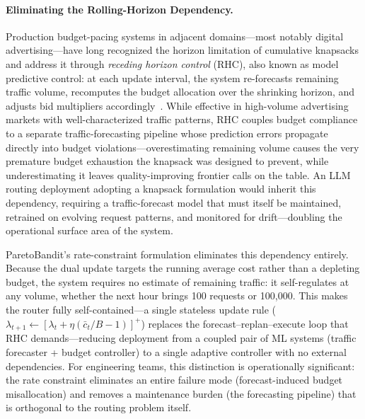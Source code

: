 \paragraph{Eliminating the Rolling-Horizon Dependency.}
Production budget-pacing systems in adjacent domains---most notably digital advertising---have long recognized the horizon limitation of cumulative knapsacks and address it through \emph{receding horizon control} (RHC), also known as model predictive control: at each update interval, the system re-forecasts remaining traffic volume, recomputes the budget allocation over the shrinking horizon, and adjusts bid multipliers accordingly~\cite{chen2025budgetpacing}.
While effective in high-volume advertising markets with well-characterized traffic patterns, RHC couples budget compliance to a separate traffic-forecasting pipeline whose prediction errors propagate directly into budget violations---overestimating remaining volume causes the very premature budget exhaustion the knapsack was designed to prevent, while underestimating it leaves quality-improving frontier calls on the table.
An LLM routing deployment adopting a knapsack formulation would inherit this dependency, requiring a traffic-forecast model that must itself be maintained, retrained on evolving request patterns, and monitored for drift---doubling the operational surface area of the system.

ParetoBandit's rate-constraint formulation eliminates this dependency entirely.
Because the dual update targets the running average cost rather than a depleting budget, the system requires no estimate of remaining traffic: it self-regulates at any volume, whether the next hour brings 100 requests or 100{,}000.
This makes the router fully self-contained---a single stateless update rule ($\lambda_{t+1} \leftarrow [\lambda_t + \eta(\bar{c}_t/B - 1)]^+$) replaces the forecast--replan--execute loop that RHC demands---reducing deployment from a coupled pair of ML systems (traffic forecaster + budget controller) to a single adaptive controller with no external dependencies.
For engineering teams, this distinction is operationally significant: the rate constraint eliminates an entire failure mode (forecast-induced budget misallocation) and removes a maintenance burden (the forecasting pipeline) that is orthogonal to the routing problem itself.

